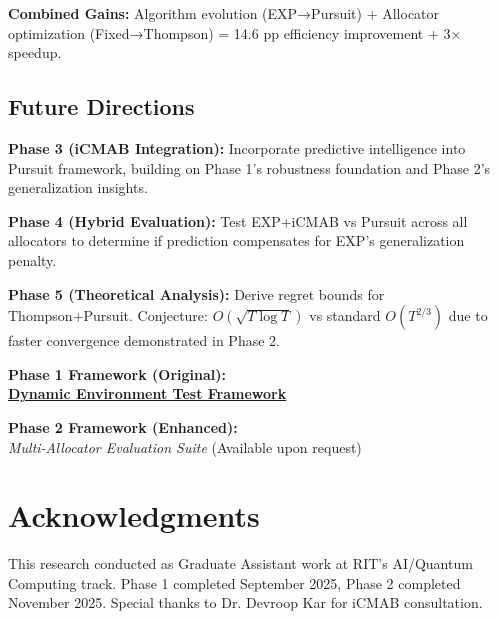 \documentclass[11pt,a4paper]{article}
\newcommand{\colab}[1]{\textcolor{colabcolor}{\textbf{#1}}}
\begin{document}
\textbf{Combined Gains:} Algorithm evolution (EXP→Pursuit) + Allocator optimization (Fixed→Thompson) = 14.6 pp efficiency improvement + 3× speedup.

\subsection{Future Directions}

\textbf{Phase 3 (iCMAB Integration):} Incorporate predictive intelligence into Pursuit framework, building on Phase 1's robustness foundation and Phase 2's generalization insights.

\textbf{Phase 4 (Hybrid Evaluation):} Test EXP+iCMAB vs Pursuit across all allocators to determine if prediction compensates for EXP's generalization penalty.

\textbf{Phase 5 (Theoretical Analysis):} Derive regret bounds for Thompson+Pursuit. Conjecture: $O(\sqrt{T \log T})$ vs standard $O(T^{2/3})$ due to faster convergence demonstrated in Phase 2.

\begin{tcolorbox}[colback=colabcolor!20,colframe=colabcolor,title=\textbf{Interactive Framework Access}]
\begin{center}
\textbf{Phase 1 Framework (Original):}\\
\href{https://colab.research.google.com/drive/1JWB3CS-Q37I58EcQKUKe-k-q2PH8WM0U}{\colab{Dynamic Environment Test Framework}}

\textbf{Phase 2 Framework (Enhanced):}\\
\textit{Multi-Allocator Evaluation Suite} (Available upon request)
\end{center}
\end{tcolorbox}

\section{Acknowledgments}
This research conducted as Graduate Assistant work at RIT's AI/Quantum Computing track. Phase 1 completed September 2025, Phase 2 completed November 2025. Special thanks to Dr. Devroop Kar for iCMAB consultation.
\end{document}
